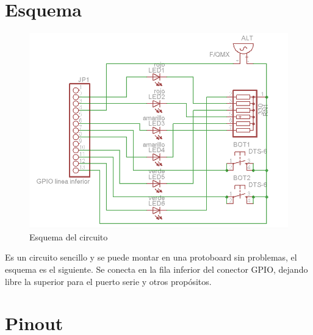 
\pagestyle{fancy}
\fancyhead[LE,RO]{\thepage}
\fancyhead[LO]{\nouppercase{\rightmark}}

\label{chp:PlacaAux}
\minitoc

\section{Esquema}

\begin{figure}[h]
  \centering
    \includegraphics[width=14cm]{graphs/circuito.png}
  \caption{Esquema del circuito}
  \label{fig:circuito}
\end{figure}

Es un circuito sencillo y se puede montar en una protoboard sin
problemas, el esquema es el siguiente. Se conecta en la fila
inferior del conector GPIO, dejando libre la superior para el puerto
serie y otros propósitos.

\section{Pinout}

